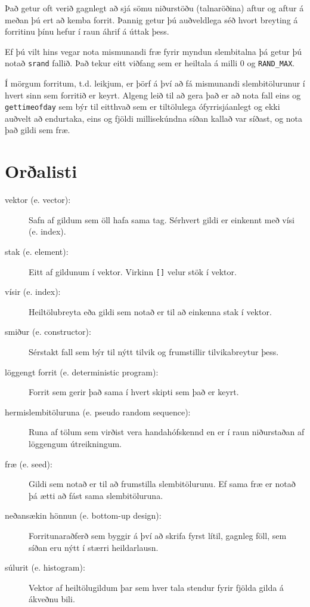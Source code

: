 Það getur oft verið gagnlegt að sjá sömu niðurstöðu (talnaröðina) aftur og aftur á meðan þú ert að kemba forrit.
Þannig getur þú auðveldlega séð hvort breyting á forritinu þínu hefur í raun áhrif á úttak þess.

Ef þú vilt hins vegar nota mismunandi fræ fyrir myndun slembitalna þá getur þú notað {\tt srand} fallið.
Það tekur eitt viðfang sem er heiltala á milli 0 og {\tt RAND\_MAX}.

Í mörgum forritum, t.d. leikjum, er þörf á því að fá mismunandi slembitölurunur í hvert sinn sem forritið er keyrt.
Algeng leið til að gera það er að nota fall eins og {\tt gettimeofday} sem býr til eitthvað sem er tiltölulega ófyrrisjáanlegt og ekki auðvelt að endurtaka,
eins og fjöldi millisekúndna síðan kallað var síðast, og nota það gildi sem fræ.

\section{Orðalisti}

\begin{description}

\item[vektor (e. vector):]  Safn af gildum sem öll hafa sama tag. Sérhvert gildi er einkennt með vísi (e. index).

\item[stak (e. element):]  Eitt af gildunum í vektor. Virkinn {\tt []} velur stök í vektor.

\item[vísir (e. index):]  Heiltölubreyta eða gildi sem notað er til að einkenna stak í vektor. 

\item[smiður (e. constructor):]  Sérstakt fall sem býr til nýtt tilvik og frumstillir tilvikabreytur þess.

\item[löggengt forrit (e. deterministic program):]  Forrit sem gerir það sama í hvert skipti sem það er keyrt.

\item[hermislembitöluruna (e. pseudo random sequence):]  Runa af tölum sem virðist vera handahófskennd en er í raun niðurstaðan af löggengum útreikningum.

\item[fræ (e. seed):]  Gildi sem notað er til að frumstilla slembitölurunu.
Ef sama fræ er notað þá ætti að fást sama slembitöluruna.

\item[neðansækin hönnun (e. bottom-up design):]  Forritunaraðferð sem byggir á því að skrifa fyrst lítil, gagnleg föll, sem síðan eru nýtt í stærri heildarlausn.

\item[súlurit (e. histogram):]  Vektor af heiltölugildum þar sem hver tala stendur fyrir fjölda gilda á ákveðnu bili.


\end{description}

